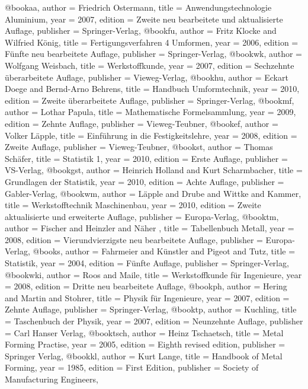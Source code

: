                   @book{aa,
author = {Friedrich Ostermann},
title = {Anwendungstechnologie Aluminium},
year = {2007},
edition = {Zweite neu bearbeitete und aktualisierte Auflage},
publisher = {Springer-Verlag},
}
@book{fu,
author = {Fritz Klocke and Wilfried König},
title = {Fertigungsverfahren 4 Umformen},
year = {2006},
edition = {Fünfte neu bearbeitete Auflage},
publisher = {Springer-Verlag},
}
@book{wk,
author = {Wolfgang Weisbach},
title = {Werkstoffkunde},
year = {2007},
edition = {Sechzehnte überarbeitete Auflage},
publisher = {Vieweg-Verlag},
}
@book{hu,
author = {Eckart Doege and Bernd-Arno Behrens},
title = {Handbuch Umformtechnik},
year = {2010},
edition = {Zweite überarbeitete Auflage},
publisher = {Springer-Verlag},
}
@book{mf,
author = {Lothar Papula},
title = {Mathematische Formelsammlung},
year = {2009},
edition = {Zehnte Auflage},
publisher = {Vieweg-Teubner},
}
@book{ef,
author = {Volker Läpple},
title = {Einführung in die Festigkeitslehre},
year = {2008},
edition = {Zweite Auflage},
publisher = {Vieweg-Teubner},
}
@book{st,
author = {Thomas Schäfer},
title = {Statistik 1},
year = {2010},
edition = {Erste Auflage},
publisher = {VS-Verlag},
}
@book{gst,
author = {Heinrich Holland and Kurt Scharmbacher},
title = {Grundlagen der Statistik},
year = {2010},
edition = {Achte Auflage},
publisher = {Gabler-Verlag},
}
@book{wm,
author = {Läpple and Drube and Wittke and Kammer},
title = {Werkstofftechnik Maschinenbau},
year = {2010},
edition = {Zweite aktualisierte und erweiterte Auflage},
publisher = {Europa-Verlag},
}
@book{tm,
author = {Fischer and Heinzler and Näher },
title = {Tabellenbuch Metall},
year = {2008},
edition = {Vierundvierzigste neu bearbeitete Auflage},
publisher = {Europa-Verlag},
}
@book{s,
author = {Fahrmeier and Künstler and Pigeot and Tutz},
title = {Statistik},
year = {2004},
edition = {Fünfte Auflage},
publisher = {Springer-Verlag},
}
@book{wki,
author = {Roos and Maile},
title = {Werkstoffkunde für Ingenieure},
year = {2008},
edition = {Dritte neu bearbeitete Auflage},
}
@book{ph,
author = {Hering and Martin and Stohrer},
title = {Physik für Ingenieure},
year = {2007},
edition = {Zehnte Auflage},
publisher = {Springer-Verlag},
}
@book{tp,
author = {Kuchling},
title = {Taschenbuch der Physik},
year = {2007},
edition = {Neunzehnte Auflage},
publisher = {Carl Hanser Verlag},
}
@book{tsch,
author = {Heinz Tschaetsch},
title = {Metal Forming Practise},
year = {2005},
edition = {Eighth revised edition},
publisher = {Springer Verlag},
}
@book{kl,
author = {Kurt Lange},
title = {Handbook of Metal Forming},
year = {1985},
edition = {First Edition},
publisher = {Society of Manufacturing Engineers},
}

